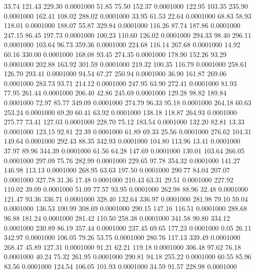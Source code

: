  33.74  121.43  229.30   0.0001000
  51.85   75.50  152.37   0.0001000
 122.95  103.35  235.90   0.0001000
 162.41  108.02  288.02   0.0001000
  33.95   61.53   22.64   0.0001000
  68.83   58.93  118.01   0.0001000
 188.07   55.87  329.84   0.0001000
 116.26   87.74  187.86   0.0001000
 247.15   86.45  197.73   0.0001000
 100.23  110.60  126.02   0.0001000
 294.33   98.40  296.11   0.0001000
 103.64   96.73  359.36   0.0001000
 224.68  116.14  267.68   0.0001000
  14.92   60.16  330.00   0.0001000
 168.08   93.45  274.35   0.0001000
 178.90  152.26   93.29   0.0001000
 202.88  163.92  301.59   0.0001000
 219.32  100.35  116.79   0.0001000
 258.61  126.70  293.41   0.0001000
  94.54   67.27  250.94   0.0001000
  36.90  161.87  269.06   0.0001000
 283.73   93.71  214.12   0.0001000
 247.95   63.90  272.41   0.0001000
  81.93   77.95  261.44   0.0001000
 206.40   42.86  245.69   0.0001000
 129.28   98.82  189.84   0.0001000
  72.97   85.77  349.09   0.0001000
 274.79   96.33   95.18   0.0001000
 264.18   60.63  253.24   0.0001000
  69.20   60.41   63.92   0.0001000
 138.18  118.87  264.93   0.0001000
 275.77   73.41  127.03   0.0001000
 228.70   75.12  183.54   0.0001000
 132.20   82.81   13.33   0.0001000
 123.15   92.81   22.39   0.0001000
  61.89   69.33   25.56   0.0001000
 276.62  104.31  149.64   0.0001000
 292.43   88.35  342.93   0.0001000
 104.80  113.96   13.41   0.0001000
  37.97   89.96  344.39   0.0001000
  61.56   64.28  147.69   0.0001000
 130.01  103.64  266.05   0.0001000
 297.09   75.76  282.99   0.0001000
 229.65   97.78  354.32   0.0001000
 141.27  146.98  113.13   0.0001000
 268.95   63.63  197.50   0.0001000
 290.77   84.04  207.07   0.0001000
 327.78   31.36   17.48   0.0001000
 210.43   63.31   29.51   0.0001000
 227.92  110.02   39.09   0.0001000
  51.09   77.57   93.95   0.0001000
 262.98   88.96   32.48   0.0001000
 121.47   93.36  336.71   0.0001000
 328.40  132.64  336.97   0.0001000
 281.98   79.10   59.04   0.0001000
 136.53  100.99  308.69   0.0001000
 290.15  147.16  116.51   0.0001000
 288.68   96.88  181.24   0.0001000
 281.42  110.50  258.38   0.0001000
 341.58   90.80  334.12   0.0001000
 230.89   86.19  357.44   0.0001000
 237.45   69.65  177.23   0.0001000
   0.05   26.11  342.97   0.0001000
 106.05   79.26   53.75   0.0001000
 280.76  117.13  339.49   0.0001000
 268.47   45.89  127.31   0.0001000
  91.21   62.21  119.18   0.0001000
 306.48   97.62   76.18   0.0001000
  40.24   75.32  261.95   0.0001000
 290.81   94.18  255.22   0.0001000
  60.55   85.96   83.56   0.0001000
 124.54  106.05  101.93   0.0001000
  34.59   91.57  228.98   0.0001000
